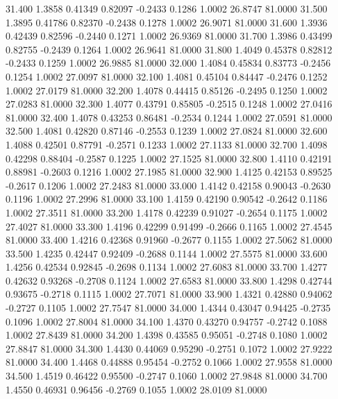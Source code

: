   31.400   1.3858   0.41349   0.82097  -0.2433   0.1286   1.0002  26.8747  81.0000
  31.500   1.3895   0.41786   0.82370  -0.2438   0.1278   1.0002  26.9071  81.0000
  31.600   1.3936   0.42439   0.82596  -0.2440   0.1271   1.0002  26.9369  81.0000
  31.700   1.3986   0.43499   0.82755  -0.2439   0.1264   1.0002  26.9641  81.0000
  31.800   1.4049   0.45378   0.82812  -0.2433   0.1259   1.0002  26.9885  81.0000
  32.000   1.4084   0.45834   0.83773  -0.2456   0.1254   1.0002  27.0097  81.0000
  32.100   1.4081   0.45104   0.84447  -0.2476   0.1252   1.0002  27.0179  81.0000
  32.200   1.4078   0.44415   0.85126  -0.2495   0.1250   1.0002  27.0283  81.0000
  32.300   1.4077   0.43791   0.85805  -0.2515   0.1248   1.0002  27.0416  81.0000
  32.400   1.4078   0.43253   0.86481  -0.2534   0.1244   1.0002  27.0591  81.0000
  32.500   1.4081   0.42820   0.87146  -0.2553   0.1239   1.0002  27.0824  81.0000
  32.600   1.4088   0.42501   0.87791  -0.2571   0.1233   1.0002  27.1133  81.0000
  32.700   1.4098   0.42298   0.88404  -0.2587   0.1225   1.0002  27.1525  81.0000
  32.800   1.4110   0.42191   0.88981  -0.2603   0.1216   1.0002  27.1985  81.0000
  32.900   1.4125   0.42153   0.89525  -0.2617   0.1206   1.0002  27.2483  81.0000
  33.000   1.4142   0.42158   0.90043  -0.2630   0.1196   1.0002  27.2996  81.0000
  33.100   1.4159   0.42190   0.90542  -0.2642   0.1186   1.0002  27.3511  81.0000
  33.200   1.4178   0.42239   0.91027  -0.2654   0.1175   1.0002  27.4027  81.0000
  33.300   1.4196   0.42299   0.91499  -0.2666   0.1165   1.0002  27.4545  81.0000
  33.400   1.4216   0.42368   0.91960  -0.2677   0.1155   1.0002  27.5062  81.0000
  33.500   1.4235   0.42447   0.92409  -0.2688   0.1144   1.0002  27.5575  81.0000
  33.600   1.4256   0.42534   0.92845  -0.2698   0.1134   1.0002  27.6083  81.0000
  33.700   1.4277   0.42632   0.93268  -0.2708   0.1124   1.0002  27.6583  81.0000
  33.800   1.4298   0.42744   0.93675  -0.2718   0.1115   1.0002  27.7071  81.0000
  33.900   1.4321   0.42880   0.94062  -0.2727   0.1105   1.0002  27.7547  81.0000
  34.000   1.4344   0.43047   0.94425  -0.2735   0.1096   1.0002  27.8004  81.0000
  34.100   1.4370   0.43270   0.94757  -0.2742   0.1088   1.0002  27.8439  81.0000
  34.200   1.4398   0.43585   0.95051  -0.2748   0.1080   1.0002  27.8847  81.0000
  34.300   1.4430   0.44069   0.95290  -0.2751   0.1072   1.0002  27.9222  81.0000
  34.400   1.4468   0.44888   0.95454  -0.2752   0.1066   1.0002  27.9558  81.0000
  34.500   1.4519   0.46422   0.95500  -0.2747   0.1060   1.0002  27.9848  81.0000
  34.700   1.4550   0.46931   0.96456  -0.2769   0.1055   1.0002  28.0109  81.0000
